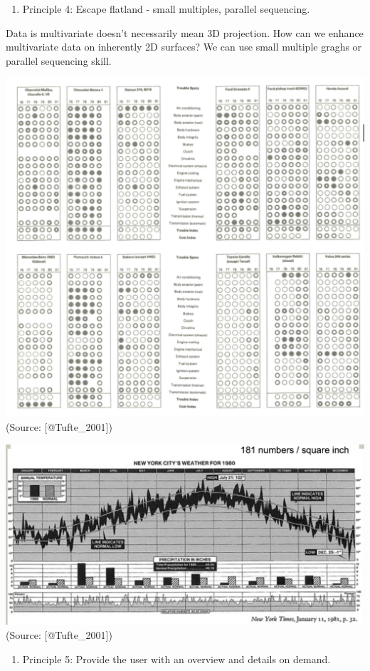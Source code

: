 \documentclass[]{book}
\providecommand{\tightlist}{%
  \setlength{\itemsep}{0pt}\setlength{\parskip}{0pt}}
\theoremstyle{definition}
\theoremstyle{definition}
\theoremstyle{definition}
\theoremstyle{remark}
\begin{document}
\begin{enumerate}
\def\labelenumi{\arabic{enumi}.}
\setcounter{enumi}{3}
\tightlist
\item
  Principle 4: Escape flatland - small multiples, parallel sequencing.
\end{enumerate}

Data is multivariate doesn't necessarily mean 3D projection. How can we
enhance multivariate data on inherently 2D surfaces? We can use small
multiple graghs or parallel sequencing skill.

\includegraphics{images/Tufte_figure8.png} (Source: {[}@Tufte\_2001{]})

\includegraphics{images/Tufte_figure7.png} (Source: {[}@Tufte\_2001{]})

\begin{enumerate}
\def\labelenumi{\arabic{enumi}.}
\setcounter{enumi}{4}
\tightlist
\item
  Principle 5: Provide the user with an overview and details on demand.
\end{enumerate}
\end{document}
